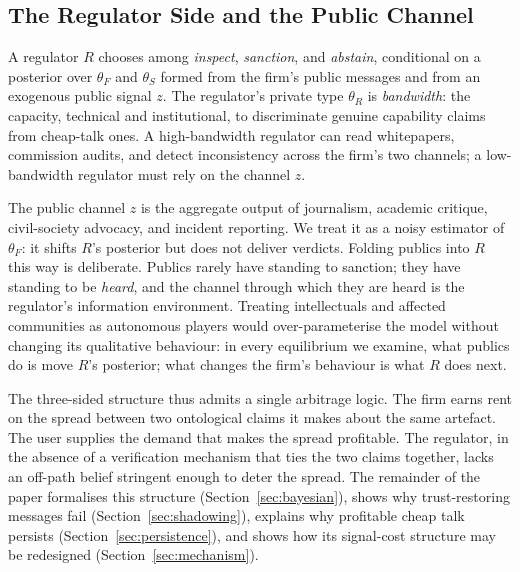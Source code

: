 \documentclass[review,authoryear]{elsarticle}
\theoremstyle{definition}
\theoremstyle{plain}
\begin{document}
\subsection{The Regulator Side and the Public Channel}
\label{subsec:regulator-side}

A regulator $R$ chooses among \emph{inspect}, \emph{sanction}, and \emph{abstain}, conditional on a posterior over $\theta_F$ and $\theta_S$ formed from the firm's public messages and from an exogenous public signal $z$. The regulator's private type $\theta_R$ is \emph{bandwidth}: the capacity, technical and institutional, to discriminate genuine capability claims from cheap-talk ones. A high-bandwidth regulator can read whitepapers, commission audits, and detect inconsistency across the firm's two channels; a low-bandwidth regulator must rely on the channel $z$.

The public channel $z$ is the aggregate output of journalism, academic critique, civil-society advocacy, and incident reporting. We treat it as a noisy estimator of $\theta_F$: it shifts $R$'s posterior but does not deliver verdicts. Folding publics into $R$ this way is deliberate. Publics rarely have standing to sanction; they have standing to be \emph{heard}, and the channel through which they are heard is the regulator's information environment. Treating intellectuals and affected communities as autonomous players would over-parameterise the model without changing its qualitative behaviour: in every equilibrium we examine, what publics do is move $R$'s posterior; what changes the firm's behaviour is what $R$ does next.

The three-sided structure thus admits a single arbitrage logic. The firm earns rent on the spread between two ontological claims it makes about the same artefact. The user supplies the demand that makes the spread profitable. The regulator, in the absence of a verification mechanism that ties the two claims together, lacks an off-path belief stringent enough to deter the spread. The remainder of the paper formalises this structure (Section~\ref{sec:bayesian}), shows why trust-restoring messages fail (Section~\ref{sec:shadowing}), explains why profitable cheap talk persists (Section~\ref{sec:persistence}), and shows how its signal-cost structure may be redesigned (Section~\ref{sec:mechanism}).
\end{document}

